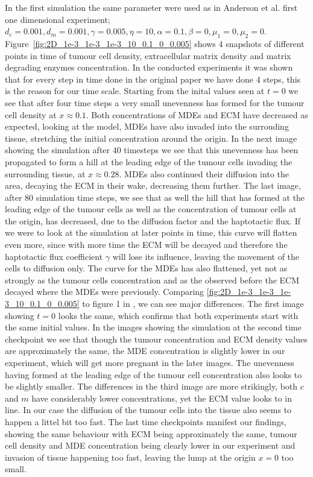 In the first simulation the same parameter were used as in Anderson et al. first one dimensional experiment; $d_c = 0.001, d_m = 0.001, \gamma = 0.005, \eta = 10, \alpha = 0.1, \beta = 0, \mu_1 = 0, \mu_2 = 0$. Figure~\ref{fig:2D_1e-3_1e-3_1e-3_10_0.1_0_0.005} shows 4 snapshots of different points in time of tumour cell density, extracellular matrix density and matrix degrading enzymes concentration. In the conducted experiments it was shown that for every step in time done in the original paper we have done 4 steps, this is the reason for our time scale. Starting from the inital values seen at $t=0$ we see that after four time steps a very small unevenness has formed for the tumour cell density at $x\approx 0.1$. Both concentrations of MDEs and ECM have decreased as expected, looking at the model, MDEs have also invaded into the surrouding tissue, stretching the initial concentration around the origin.
In the next image showing the simulation after 40 timesteps we see that this unevenness has been propagated to form a hill at the leading edge of the tumour cells invading the surrounding tissue, at $x\approx 0.28$. MDEs also continued their diffusion into the area, decaying the ECM in their wake, decreasing them further. 
The last image, after 80 simulation time steps, we see that as well the hill that has formed at the leading edge of the tumour cells as well as the concentration of tumour cells at the origin, has decreased, due to the diffusion factor and the haptotactic flux. If we were to look at the simulation at later points in time, this curve will flatten even more, since with more time the ECM will be decayed and therefore the haptotactic flux coefficient $\gamma$ will lose its influence, leaving the movement of the cells to diffusion only. The curve for the MDEs has also flattened, yet not as strongly as the tumour cells concentration and as the observed before the ECM decayed where the MDEs were previously.\newline
Comparing \ref{fig:2D_1e-3_1e-3_1e-3_10_0.1_0_0.005} to figure 1 in \cite{anderson_mathematical_2000}, we can see major differences. The first image showing $t=0$ looks the same, which confirms that both experiments start with the same initial values. In the images showing the simulation at the second time checkpoint we see that though the tumour concentration and ECM density values are approximately the same, the MDE concentration is slightly lower in our experiment, which will get more pregnant in the later images. The unevenness having formed at the leading edge of the tumour cell concentration also looks to be slightly smaller. The differences in the third image are more strikingly, both $c$ and $m$ have considerably lower concentrations, yet the ECM value looks to in line. In our case the diffusion of the tumour cells into the tissue also seems to happen a littel bit too fast. The last time checkpoints manifest our findings, showing the same behaviour with ECM being approximately the same, tumour cell density and MDE concentration being clearly lower in our experiment and invasion of tissue happening too fast, leaving the lump at the origin $x=0$ too small. \newline 

